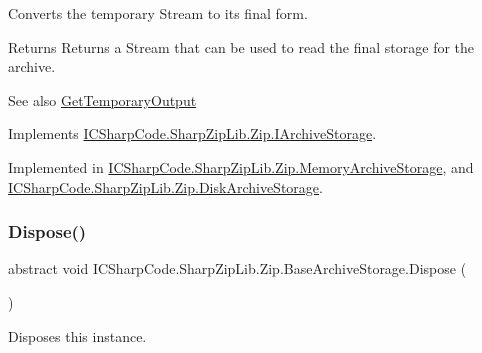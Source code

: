Converts the temporary Stream to its final form. 

\begin{DoxyReturn}{Returns}
Returns a Stream that can be used to read the final storage for the archive.
\end{DoxyReturn}
\begin{DoxySeeAlso}{See also}
\hyperlink{class_i_c_sharp_code_1_1_sharp_zip_lib_1_1_zip_1_1_base_archive_storage_a1327afcc22749a88959c9d8614cf4c75}{Get\+Temporary\+Output}


\end{DoxySeeAlso}


Implements \hyperlink{interface_i_c_sharp_code_1_1_sharp_zip_lib_1_1_zip_1_1_i_archive_storage_aa254436478256b7d33cf2739002346f5}{I\+C\+Sharp\+Code.\+Sharp\+Zip\+Lib.\+Zip.\+I\+Archive\+Storage}.



Implemented in \hyperlink{class_i_c_sharp_code_1_1_sharp_zip_lib_1_1_zip_1_1_memory_archive_storage_a15c32e570f6ac74b5909cae3e22d84f4}{I\+C\+Sharp\+Code.\+Sharp\+Zip\+Lib.\+Zip.\+Memory\+Archive\+Storage}, and \hyperlink{class_i_c_sharp_code_1_1_sharp_zip_lib_1_1_zip_1_1_disk_archive_storage_a90e6fad96f28a6539c5ea2b4a0ac28c0}{I\+C\+Sharp\+Code.\+Sharp\+Zip\+Lib.\+Zip.\+Disk\+Archive\+Storage}.

\mbox{\label{class_i_c_sharp_code_1_1_sharp_zip_lib_1_1_zip_1_1_base_archive_storage_a570815be2a90ac68ada8a48eb4f5415b}} 
\subsubsection{\texorpdfstring{Dispose()}{Dispose()}}
{\footnotesize\ttfamily abstract void I\+C\+Sharp\+Code.\+Sharp\+Zip\+Lib.\+Zip.\+Base\+Archive\+Storage.\+Dispose (\begin{DoxyParamCaption}{ }\end{DoxyParamCaption})\hspace{0.3cm}{\ttfamily [pure virtual]}}



Disposes this instance. 




